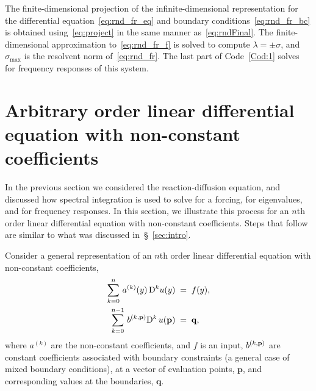 \documentclass[%
secnumarabic,%
 amssymb, amsmath,%
 aps,prf,superscriptaddress,longbibliography
frontmatterverbose,
]{revtex4-2}
\newcommand{\sref}[1]{\S~\ref{#1}}
\begin{document}
The finite-dimensional projection of the infinite-dimensional representation for the differential equation~\eqref{eq:rnd_fr_eq} and boundary conditions~\eqref{eq:rnd_fr_bc} is obtained using~\eqref{eq:project} in the same manner as~\eqref{eq:rndFinal}. The finite-dimensional approximation to~\eqref{eq:rnd_fr_f} is solved to compute $\lambda = \pm \sigma$, and $\sigma_{\mathrm{max}}$ is the resolvent norm of~\eqref{eq:rnd_fr}. The last part of Code~\ref{Cod:1} solves for frequency responses of this system.

\section{Arbitrary order linear differential equation with non-constant coefficients}
In the previous section we considered the reaction-diffusion equation, and discussed how spectral integration is used to solve for a forcing, for eigenvalues, and for frequency responses. In this section, we illustrate this process for an $n$th order linear differential equation with non-constant coefficients. Steps that follow are similar to what was discussed in~\sref{sec:intro}. 

Consider a general representation of an $n$th order linear differential equation with non-constant coefficients,
\begin{subequations}\label{eq:1}
\begin{align}
    \sum_{k = 0}^{n}\, a^{(k)}(y)\, \mathrm D^k u(y) \;&=\; f(y),\label{eq:1a}\\
    \sum_{k = 0}^{n-1}\,b^{(k,\mathbf p)}\mathrm D^k\,u(\mathbf p) \;&=\; \mathbf q,\label{eq:1b}
\end{align}
\end{subequations}
where $a^{(k)}$ are the non-constant coefficients, and $f$ is an input, $b^{(k,\mathbf{p})}$ are constant coefficients associated with boundary constraints (a general case of mixed boundary conditions), at a vector of evaluation points, $\mathbf p$, and corresponding values at the boundaries, $\mathbf q$. 
\end{document}
